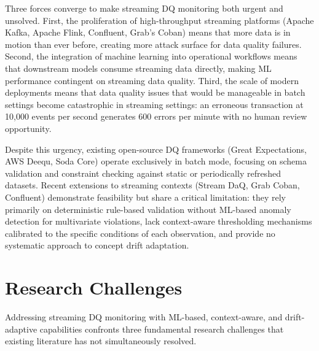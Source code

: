 Three forces converge to make streaming DQ monitoring both urgent and unsolved. First, the proliferation of high-throughput streaming platforms (Apache Kafka, Apache Flink, Confluent, Grab's Coban) means that more data is in motion than ever before, creating more attack surface for data quality failures. Second, the integration of machine learning into operational workflows means that downstream models consume streaming data directly, making ML performance contingent on streaming data quality. Third, the scale of modern deployments means that data quality issues that would be manageable in batch settings become catastrophic in streaming settings: an erroneous transaction at 10,000 events per second generates 600 errors per minute with no human review opportunity.

Despite this urgency, existing open-source DQ frameworks (Great Expectations, AWS Deequ, Soda Core) operate exclusively in batch mode, focusing on schema validation and constraint checking against static or periodically refreshed datasets. Recent extensions to streaming contexts (Stream DaQ, Grab Coban, Confluent) demonstrate feasibility but share a critical limitation: they rely primarily on deterministic rule-based validation without ML-based anomaly detection for multivariate violations, lack context-aware thresholding mechanisms calibrated to the specific conditions of each observation, and provide no systematic approach to concept drift adaptation.

\section{Research Challenges}

Addressing streaming DQ monitoring with ML-based, context-aware, and drift-adaptive capabilities confronts three fundamental research challenges that existing literature has not simultaneously resolved.


